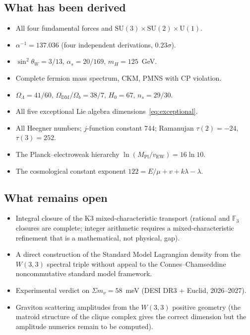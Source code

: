 \documentclass[12pt,a4paper]{article}
\theoremstyle{definition}
\newcommand{\SU}{\mathrm{SU}}
\newcommand{\vEW}{v_{\mathrm{EW}}}
\newcommand{\FF}{\mathbb{F}}
\begin{document}
\subsection{What has been derived}

\begin{itemize}[nosep]
\item All four fundamental forces and $\SU(3)\times\SU(2)\times\mathrm{U}(1)$.
\item $\alpha^{-1}=137.036$ (four independent derivations, $0.23\sigma$).
\item $\sin^2\theta_W=3/13$, $\alpha_s=20/169$, $m_H=125$~GeV.
\item Complete fermion mass spectrum, CKM, PMNS with CP violation.
\item $\Omega_\Lambda=41/60$, $\Omega_{\mathrm{DM}}/\Omega_b=38/7$,
  $H_0=67$, $n_s=29/30$.
\item All five exceptional Lie algebra dimensions~\eqref{eq:exceptional}.
\item All Heegner numbers; $j$-function constant $744$;
  Ramanujan $\tau(2)=-24$, $\tau(3)=252$.
\item The Planck--electroweak hierarchy $\ln(M_{\mathrm{Pl}}/\vEW)=16\ln 10$.
\item The cosmological constant exponent $122=E/\mu+v+k\lambda-\lambda$.
\end{itemize}

\subsection{What remains open}

\begin{itemize}[nosep]
\item Integral closure of the K3 mixed-characteristic transport
  (rational and $\FF_3$ closures are complete; integer arithmetic
  requires a mixed-characteristic refinement that is a mathematical,
  not physical, gap).
\item A direct construction of the Standard Model Lagrangian density
  from the $W(3,3)$ spectral triple without appeal to the Connes--Chamseddine
  noncommutative standard model framework.
\item Experimental verdict on $\Sigma m_\nu=58$~meV
  (DESI DR3 + Euclid, 2026--2027).
\item Graviton scattering amplitudes from the $W(3,3)$ positive geometry
  (the matroid structure of the clique complex gives the correct dimension
  but the amplitude numerics remain to be computed).
\end{itemize}
\end{document}
